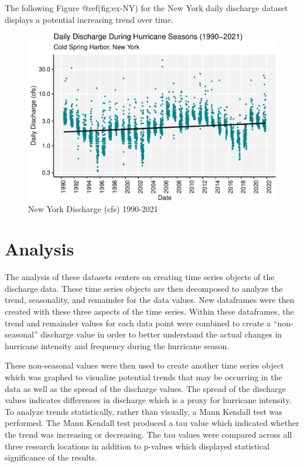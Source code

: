 \documentclass[
  12pt,
]{article}
\begin{document}
The following Figure @ref(fig:ex-NY) for the New York daily discharge
dataset displays a potential increasing trend over time.

\begin{figure}

{\centering \includegraphics{BoosBrantleyHusted_ENV872_Project_files/figure-latex/ex-NY-1} 

}

\caption{New York Discharge (cfs) 1990-2021}\label{fig:ex-NY}
\end{figure}

\newpage

\hypertarget{analysis}{%
\section{Analysis}\label{analysis}}

The analysis of these datasets centers on creating time series objects
of the discharge data. These time series objects are then decomposed to
analyze the trend, seasonality, and remainder for the data values. New
dataframes were then created with these three aspects of the time
series. Within these dataframes, the trend and remainder values for each
data point were combined to create a ``non-seasonal'' discharge value in
order to better understand the actual changes in hurricane intensity and
frequency during the hurricane season.

These non-seasonal values were then used to create another time series
object which was graphed to visualize potential trends that may be
occurring in the data as well as the spread of the discharge values. The
spread of the discharge values indicates differences in discharge which
is a proxy for hurricane intensity. To analyze trends statistically,
rather than visually, a Mann Kendall test was performed. The Mann
Kendall test produced a tau value which indicated whether the trend was
increasing or decreasing. The tau values were compared across all three
research locations in addition to p-values which displayed statistical
significance of the results.
\end{document}
